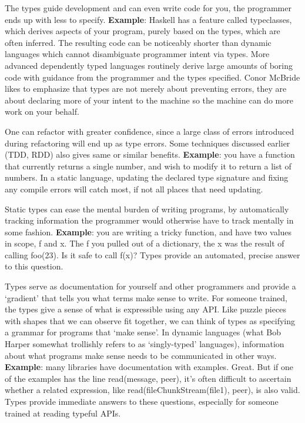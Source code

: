 The types guide development and can even write code for you, the programmer ends
up with less to specify. \textbf{Example}: Haskell has a
feature called typeclasses, which derives aspects of your program, purely based
on the types, which are often inferred. The resulting code can be noticeably
shorter than dynamic languages which cannot disambiguate programmer intent via
types. More advanced dependently typed languages routinely derive large amounts
of boring code with guidance from the programmer and the types specified. Conor
McBride likes to emphasize that types are not merely about preventing
errors, they are about declaring more of your intent to the machine so the
machine can do more work on your behalf.

One can refactor with greater confidence, since a large class of errors
introduced during refactoring will end up as type errors. Some techniques
discussed earlier (TDD, RDD) also gives same or similar benefits.
\textbf{Example}: you have a function that currently returns a single number,
and wish to modify it to return a list of numbers. In a static language,
updating the declared type signature and fixing any compile errors will catch
most, if not all places that need updating.

Static types can ease the mental burden of writing programs, by automatically
tracking information the programmer would otherwise have to track mentally in
some fashion. \textbf{Example}: you are writing a tricky function, and have two
values in scope, f and x. The f you pulled out of a dictionary, the x was the
result of calling foo(23). Is it safe to call f(x)? Types provide an automated,
precise answer to this question.

Types serve as documentation for yourself and other programmers and provide a
‘gradient’ that tells you what terms make sense to write. For someone trained,
the types give a sense of what is expressible using any API. Like puzzle pieces
with shapes that we can observe fit together, we can think of types as
specifying a grammar for programs that ‘make sense’. In dynamic languages (what
Bob Harper somewhat trollishly refers to as ‘singly-typed’ languages),
information about what programs make sense needs to be communicated in other
ways. \textbf{Example}: many libraries have documentation with examples. Great. But if
one of the examples has the line read(message, peer), it’s often difficult to
ascertain whether a related expression, like read(fileChunkStream(file1), peer),
is also valid. Types provide immediate answers to these questions, especially
for someone trained at reading typeful APIs.


